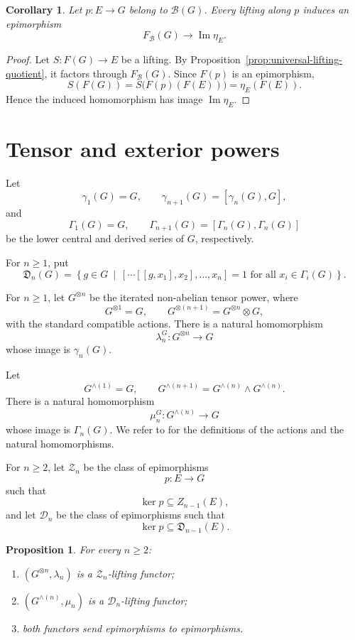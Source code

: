 \documentclass[10pt]{amsart}
\newtheorem{proposition}[theorem]{Proposition}
\newtheorem{corollary}[theorem]{Corollary}
\renewcommand{\*}{\cdot {\dots} \cdot}
\newcommand{\?}[1]{\overset{?}{#1}}
\numberwithin{equation}{section}
\begin{document}
\begin{corollary}\label{cor:universal-lifting-image}
Let $p\colon E\to G$ belong to $\mathcal B(G)$. Every lifting
along $p$ induces an epimorphism
\[
F_{\mathcal B}(G)\longrightarrow\operatorname{Im}\eta_E.
\]
\end{corollary}

\begin{proof}
Let $S\colon F(G)\to E$ be a lifting. By
Proposition~\ref{prop:universal-lifting-quotient}, it factors
through $F_{\mathcal B}(G)$. Since $F(p)$ is an epimorphism,
\[
S(F(G))
=S\bigl(F(p)(F(E))\bigr)
=\eta_E(F(E)).
\]
Hence the induced homomorphism has image
$\operatorname{Im}\eta_E$.
\end{proof}


\section{Tensor and exterior powers}
\label{sec:tensor-exterior}

Let
\[
\gamma_1(G)=G,
\qquad
\gamma_{n+1}(G)=[\gamma_n(G),G],
\]
and
\[
\Gamma_1(G)=G,
\qquad
\Gamma_{n+1}(G)=[\Gamma_n(G),\Gamma_n(G)]
\]
be the lower central and derived series of $G$, respectively.

For $n\geq 1$, put
\[
\mathfrak D_n(G)=
\left\{
g\in G\ \middle|\
[\cdots[[g,x_1],x_2],\ldots,x_n]=1
\text{ for all }x_i\in\Gamma_i(G)
\right\}.
\]

For $n\geq 1$, let $G^{\otimes n}$ be the iterated
non-abelian tensor power, where
\[
G^{\otimes 1}=G,
\qquad
G^{\otimes(n+1)}=G^{\otimes n}\otimes G,
\]
with the standard compatible actions. There is a natural
homomorphism
\[
\lambda_n^G\colon G^{\otimes n}\longrightarrow G
\]
whose image is $\gamma_n(G)$.

Let
\[
G^{\wedge(1)}=G,
\qquad
G^{\wedge(n+1)}
=
G^{\wedge(n)}\wedge G^{\wedge(n)}.
\]
There is a natural homomorphism
\[
\mu_n^G\colon G^{\wedge(n)}\longrightarrow G
\]
whose image is $\Gamma_n(G)$. We refer to
\cite{DonadzeGarciaMartinez2021} for the definitions of the
actions and the natural homomorphisms.

For $n\geq2$, let $\mathcal Z_n$ be the class of
epimorphisms
\[
p\colon E\longrightarrow G
\]
such that
\[
\ker p\subseteq Z_{n-1}(E),
\]
and let $\mathcal D_n$ be the class of epimorphisms such that
\[
\ker p\subseteq\mathfrak D_{n-1}(E).
\]

\begin{proposition}\label{prop:tensor-exterior-lifting}
For every $n\geq2$:
\begin{enumerate}
\item
$(G^{\otimes n},\lambda_n)$ is a
$\mathcal Z_n$-lifting functor;

\item
$(G^{\wedge(n)},\mu_n)$ is a
$\mathcal D_n$-lifting functor;

\item
both functors send epimorphisms to epimorphisms.
\end{enumerate}
\end{proposition}
\end{document}
